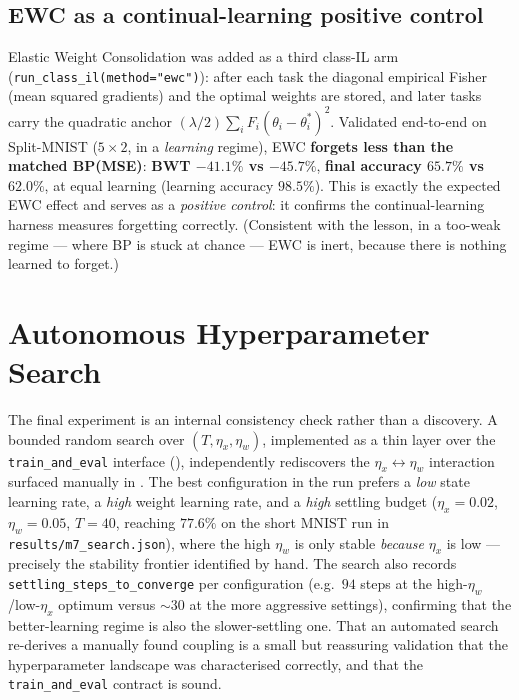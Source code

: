 \subsection{EWC as a continual-learning positive control}

Elastic Weight Consolidation \citep{kirkpatrick2017ewc} was added as a third class-IL arm
(\texttt{run\_class\_il(method="ewc")}): after each task the diagonal empirical Fisher (mean squared
gradients) and the optimal weights are stored, and later tasks carry the quadratic anchor
\((\lambda/2)\sum_i F_i(\theta_i-\theta_i^\ast)^2\). Validated end-to-end on Split-MNIST
(\(5\times2\), in a \emph{learning} regime), EWC \textbf{forgets less than the matched BP(MSE)}:
\textbf{BWT \(-41.1\%\) vs \(-45.7\%\)}, \textbf{final accuracy \(65.7\%\) vs \(62.0\%\)}, at equal
learning (learning accuracy \(98.5\%\)). This is exactly the expected EWC effect and serves as a
\emph{positive control}: it confirms the continual-learning harness measures forgetting correctly.
(Consistent with the  lesson, in a too-weak regime --- where BP is stuck at
chance --- EWC is inert, because there is nothing learned to forget.)

\section{Autonomous Hyperparameter Search}\label{sec:exp-search}

The final experiment is an internal consistency check rather than a discovery. A bounded random
search over \((T, \eta_x, \eta_w)\), implemented as a thin layer over the \texttt{train\_and\_eval}
interface (), independently rediscovers the \(\eta_x\leftrightarrow\eta_w\)
interaction surfaced manually in . The best configuration in the run prefers a
\emph{low} state learning rate, a \emph{high} weight learning rate, and a \emph{high} settling
budget (\(\eta_x=0.02\), \(\eta_w=0.05\), \(T=40\), reaching \(77.6\%\) on the short MNIST run in
\texttt{results/m7\_search.json}), where the high \(\eta_w\) is only stable \emph{because} \(\eta_x\)
is low --- precisely the stability frontier identified by hand. The search also records
\texttt{settling\_steps\_to\_converge} per configuration (e.g.\ \(94\) steps at the
high-\(\eta_w\)/low-\(\eta_x\) optimum versus \(\sim\!30\) at the more aggressive settings),
confirming that the better-learning regime is also the slower-settling one. That an automated search
re-derives a manually found coupling is a small but reassuring validation that the
hyperparameter landscape was characterised correctly, and that the \texttt{train\_and\_eval}
contract is sound.

